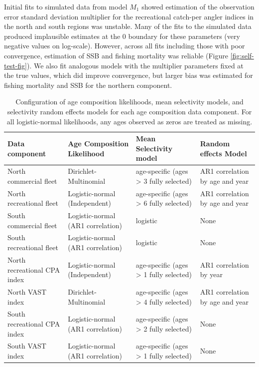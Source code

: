\documentclass[
]{article}
\begin{document}
Initial fits to simulated data from model \(M_1\) showed estimation of the observation error standard deviation multiplier for the recreational catch-per angler indices in the north and south regions was unstable. Many of the fits to the simulated data produced implausible estimates at the 0 boundary for these parameters (very negative values on log-scale). However, across all fits including those with poor convergence, estimation of SSB and fishing mortality was reliable (Figure \ref{fig:self-test-fig}). We also fit analogous models with the multiplier parameters fixed at the true values, which did improve convergence, but larger bias was estimated for fishing mortality and SSB for the northern component.

\setcounter{table}{0}
\renewcommand\thetable{S\arabic{table}}

\begin{landscape}\begin{table}

\caption{\label{tab:age-comp-sel-table}Configuration of age composition likelihoods, mean selectivity models, and selectivity random effects models for each age composition data component. For all logistic-normal likelihoods, any ages observed as zeros are treated as missing.}
\centering
\begin{tabular}[t]{llll}
\toprule
Data component & Age Composition Likelihood & Mean Selectivity model & Random effects Model\\
\midrule
North commercial fleet & Dirichlet-Multinomial & age-specific (ages > 3 fully selected) & AR1 correlation by age and year\\
North recreational fleet & Logistic-normal (Independent) & age-specific (ages > 6 fully selected) & AR1 correlation by age and year\\
South commercial fleet & Logistic-normal (AR1 correlation) & logistic & None\\
South recreational fleet & Logistic-normal (AR1 correlation) & logistic & None\\
North recreational CPA index & Logistic-normal (Independent) & age-specific (ages > 1 fully selected) & AR1 correlation by year\\
\addlinespace
North VAST index & Dirichlet-Multinomial & age-specific (ages > 4 fully selected) & AR1 correlation by age and year\\
South recreational CPA index & Logistic-normal (AR1 correlation) & age-specific (ages > 2 fully selected) & None\\
South VAST index & Logistic-normal (AR1 correlation) & age-specific (ages > 1 fully selected) & None\\
\bottomrule
\end{tabular}
\end{table}
\end{landscape}
\end{document}

